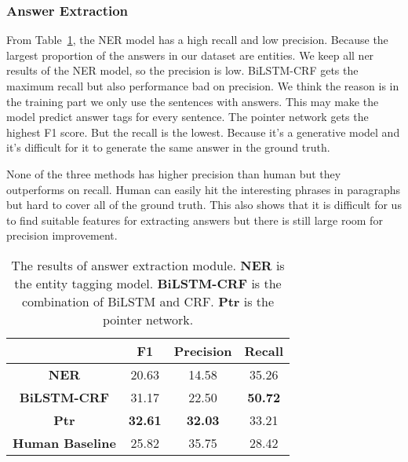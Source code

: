 \subsubsection{Answer Extraction}

From Table~\ref{tab:answer}, the NER model has a high recall and low precision. Because the largest proportion of the answers in our dataset are entities. We keep all ner results of the NER model, so the precision is low. BiLSTM-CRF gets the maximum recall but also performance bad on precision. We think the reason is in the training part we only use the sentences with answers. This may make the model predict answer tags for every sentence. The pointer network gets the highest F1 score. But the recall is the lowest. Because it's a generative model and it's difficult for it to generate the same answer in the ground truth.

None of the three methods has higher precision than human but they outperforms on recall. 
Human can easily hit the interesting phrases in paragraphs but hard to cover all of the ground truth.
This also shows that it is difficult for us to find suitable features for extracting answers but there is still large room for precision improvement.

\begin{table}[th]
\scriptsize
\centering
\begin{tabular}{cccc}
\toprule[1.5pt]
\textbf{} & \textbf{F1} & \textbf{Precision} & \textbf{Recall} \\ 
\midrule
\textbf{NER} & 20.63 & 14.58 & 35.26 \\ 
\textbf{BiLSTM-CRF} & 31.17 & 22.50 & \textbf{50.72} \\ 
\textbf{Ptr} & \textbf{32.61} & \textbf{32.03} & 33.21 \\ 
\midrule
\textbf{Human Baseline} & 25.82 & 35.75 & 28.42\\
\bottomrule[1.5pt]
\end{tabular}
\caption{\label{tab:answer} The results of answer extraction module. \textbf{NER} is the entity tagging model. \textbf{BiLSTM-CRF} is the combination of BiLSTM and CRF. \textbf{Ptr} is the pointer network.}
\end{table}


